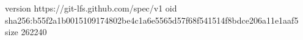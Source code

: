 version https://git-lfs.github.com/spec/v1
oid sha256:b55f2a1b0015109174802be4c1a6e5565d57f68f541514f8bdce206a11e1aaf5
size 262240
